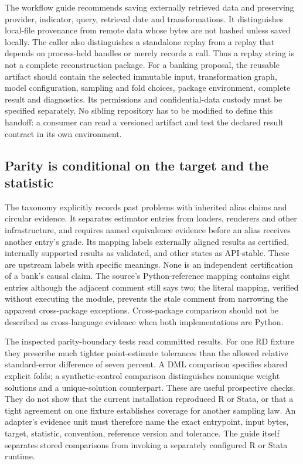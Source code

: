 The workflow guide recommends saving externally retrieved data and preserving
provider, indicator, query, retrieval date and transformations. It distinguishes
local-file provenance from remote data whose bytes are not hashed unless saved
locally. The caller also distinguishes a standalone replay from a replay that
depends on process-held handles or merely records a call. Thus a replay string
is not a complete reconstruction package. For a banking proposal, the reusable
artifact should contain the selected immutable input, transformation graph,
model configuration, sampling and fold choices, package environment, complete
result and diagnostics. Its permissions and confidential-data custody must be
specified separately. No sibling repository has to be modified to define this
handoff: a consumer can read a versioned artifact and test the declared result
contract in its own environment.
\citep{exec23_statspai_contract}

\subsection{Parity is conditional on the target and the statistic}
\label{exec23:statspai-contract-parity}
The taxonomy explicitly records past problems with inherited alias claims and
circular evidence. It separates estimator entries from loaders, renderers and
other infrastructure, and requires named equivalence evidence before an alias
receives another entry's grade. Its mapping labels externally aligned results
as certified, internally supported results as validated, and other states as
API-stable. These are upstream labels with specific meanings. None is an
independent certification of a bank's causal claim. The source's Python-reference
mapping contains eight entries although the adjacent comment still says two;
the literal mapping, verified without executing the module, prevents the stale
comment from narrowing the apparent cross-package exceptions. Cross-package
comparison should not be described as cross-language evidence when both
implementations are Python.
\citep{exec23_statspai_contract,exec23_statspai_contract_reference}

The inspected parity-boundary tests read committed results. For one RD fixture
they prescribe much tighter point-estimate tolerances than the allowed relative
standard-error difference of seven percent. A DML comparison specifies shared
explicit folds; a synthetic-control comparison distinguishes nonunique weight
solutions and a unique-solution counterpart. These are useful prospective
checks. They do not show that the current installation reproduced R or Stata,
or that a tight agreement on one fixture establishes coverage for another
sampling law. An adapter's evidence unit must therefore name the exact entrypoint,
input bytes, target, statistic, convention, reference version and tolerance.
The guide itself separates stored comparisons from invoking a separately
configured R or Stata runtime.
\citep{exec23_statspai_contract}

